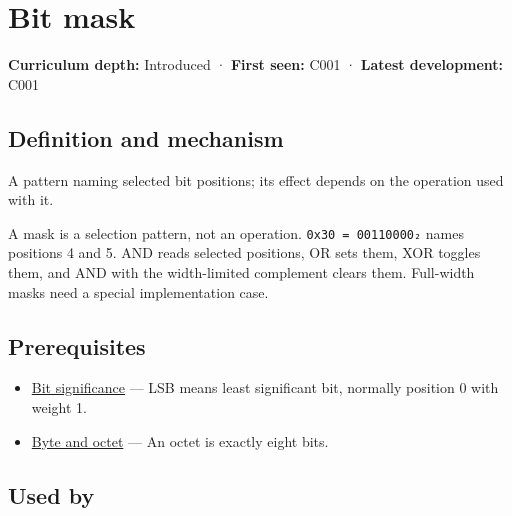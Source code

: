 \hypertarget{appendix-dbe5905163c2}{}\label{referencestart:appendix-dbe5905163c2}
\section{Bit mask}\label{appendix-dbe5905163c2-bit-mask}

\hypertarget{appendix-dbe5905163c2-bit-mask}{}

\textbf{Curriculum depth:} Introduced · \textbf{First seen:} C001 · \textbf{Latest development:} C001

\begin{allmightroledefinition}

\subsection{Definition and mechanism}\label{appendix-dbe5905163c2-definition-and-mechanism}

\hypertarget{appendix-dbe5905163c2-definition-and-mechanism}{}

A pattern naming selected bit positions; its effect depends on the operation used with it.

\end{allmightroledefinition}

A mask is a selection pattern, not an operation. \texttt{0x30\ =\ 00110000₂} names positions 4 and 5. AND reads selected positions, OR sets them, XOR toggles them, and AND with the width-limited complement clears them. Full-width masks need a special implementation case.

\subsection{Prerequisites}\label{appendix-dbe5905163c2-prerequisites}

\hypertarget{appendix-dbe5905163c2-prerequisites}{}

\begin{itemize}
\tightlist
\item
  \hyperref[appendix-280445746493]{Bit significance} --- LSB means least significant bit, normally position 0 with weight 1.
\item
  \hyperref[appendix-5bee2df85484]{Byte and octet} --- An octet is exactly eight bits.
\end{itemize}

\subsection{Used by}\label{appendix-dbe5905163c2-used-by}

